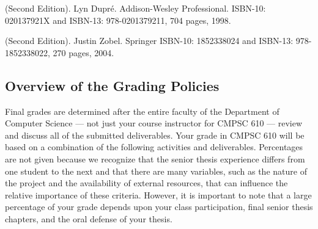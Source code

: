  (Second Edition). Lyn Dupr\'e. Addison-Wesley
Professional.  ISBN-10: 020137921X and ISBN-13: 978-0201379211, 704 pages, 1998.


 (Second Edition). Justin Zobel. Springer ISBN-10: 1852338024 and ISBN-13:
978-1852338022, 270 pages, 2004.


\vspace*{-.15in}
\subsection*{Overview of the Grading Policies}

Final grades are determined after the entire faculty of the Department of Computer Science --- not just your course
instructor for CMPSC 610 --- review and discuss all of the submitted deliverables. Your grade in CMPSC 610 will be based
on a combination of the following activities and deliverables. Percentages are not given because we recognize that the
senior thesis experience differs from one student to the next and that there are many variables, such as the nature of
the project and the availability of external resources, that can influence the relative importance of these criteria.
However, it is important to note that a large percentage of your grade depends upon your class participation, final
senior thesis chapters, and the oral defense of your thesis.

\vspace*{-.05in}

